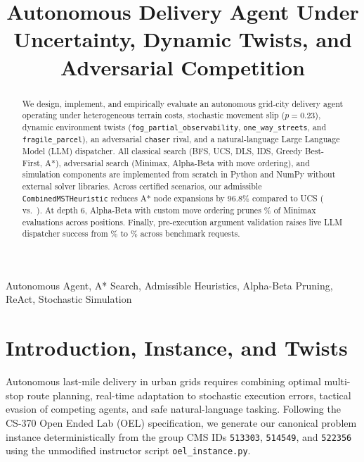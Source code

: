 \documentclass[conference]{IEEEtran}
\begin{document}
\title{Autonomous Delivery Agent Under Uncertainty, Dynamic Twists, and Adversarial Competition}

\author{
}

\maketitle
\thispagestyle{fancy}

\begin{abstract}
We design, implement, and empirically evaluate an autonomous grid-city delivery agent operating under heterogeneous terrain costs, stochastic movement slip ($p=0.23$), dynamic environment twists (\texttt{fog\_partial\_observability}, \texttt{one\_way\_streets}, and \texttt{fragile\_parcel}), an adversarial \texttt{chaser} rival, and a natural-language Large Language Model (LLM) dispatcher. All classical search (BFS, UCS, DLS, IDS, Greedy Best-First, A*), adversarial search (Minimax, Alpha-Beta with move ordering), and simulation components are implemented from scratch in Python and NumPy without external solver libraries. Across \numPartbScenarios{} certified scenarios, our admissible \texttt{CombinedMSTHeuristic} reduces A* node expansions by $96.8\%$ compared to UCS (\numPartbOwnMeanExp{} vs.\ \numPartbUcsMeanExp{}). At depth $6$, Alpha-Beta with custom move ordering prunes \numPartcPruningDSixSavedMmPct{}\% of Minimax evaluations across \numPartcPruningPositions{} positions. Finally, pre-execution argument validation raises live LLM dispatcher success from \numPartdNovalSuccessPct{}\% to \numPartdWithvalSuccessPct{}\% across \numPartdRequests{} benchmark requests.
\end{abstract}

\begin{IEEEkeywords}
Autonomous Agent, A* Search, Admissible Heuristics, Alpha-Beta Pruning, ReAct, Stochastic Simulation
\end{IEEEkeywords}

\section{Introduction, Instance, and Twists}
Autonomous last-mile delivery in urban grids requires combining optimal multi-stop route planning, real-time adaptation to stochastic execution errors, tactical evasion of competing agents, and safe natural-language tasking. Following the CS-370 Open Ended Lab (OEL) specification, we generate our canonical problem instance deterministically from the group CMS IDs \texttt{513303}, \texttt{514549}, and \texttt{522356} using the unmodified instructor script \texttt{oel\_instance.py}.
\end{document}
